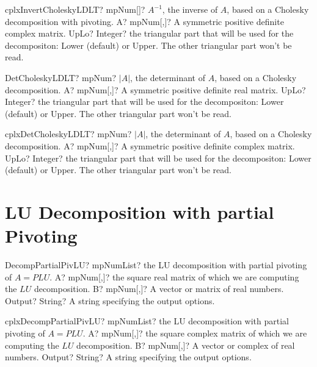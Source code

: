 \documentclass[12pt,a4paper,openany]{book}
\begin{document}
\begin{mpFunctionsExtract}
\mpFunctionTwo
{cplxInvertCholeskyLDLT? mpNum[]? $A^{-1}$, the inverse of $A$, based on a Cholesky decomposition with pivoting.}
{A? mpNum[,]? A symmetric positive definite complex matrix.}
{UpLo? Integer? the triangular part that will be used for the decompositon: Lower (default) or Upper. The other triangular part won't be read.}
\end{mpFunctionsExtract}

\begin{mpFunctionsExtract}
\mpFunctionTwo
{DetCholeskyLDLT? mpNum? $|A|$, the determinant of $A$, based on a Cholesky decomposition.}
{A? mpNum[,]? A symmetric positive definite real matrix.}
{UpLo? Integer? the triangular part that will be used for the decompositon: Lower (default) or Upper. The other triangular part won't be read.}
\end{mpFunctionsExtract}

\begin{mpFunctionsExtract}
\mpFunctionTwo
{cplxDetCholeskyLDLT? mpNum? $|A|$, the determinant of $A$, based on a Cholesky decomposition.}
{A? mpNum[,]? A symmetric positive definite complex matrix.}
{UpLo? Integer? the triangular part that will be used for the decompositon: Lower (default) or Upper. The other triangular part won't be read.}
\end{mpFunctionsExtract}

\section{LU Decomposition with partial Pivoting}

\begin{mpFunctionsExtract}
\mpFunctionThree
{DecompPartialPivLU? mpNumList? the LU decomposition with partial pivoting of $A = PLU$.}
{A? mpNum[,]? the square real matrix of which we are computing the $LU$ decomposition.}
{B? mpNum[,]? A vector or matrix of real numbers.}
{Output? String? A string specifying the output options.}
\end{mpFunctionsExtract}

\begin{mpFunctionsExtract}
\mpFunctionThree
{cplxDecompPartialPivLU? mpNumList? the LU decomposition with partial pivoting of $A = PLU$.}
{A? mpNum[,]? the square complex matrix of which we are computing the $LU$ decomposition.}
{B? mpNum[,]? A vector or complex of real numbers.}
{Output? String? A string specifying the output options.}
\end{mpFunctionsExtract}
\end{document}
